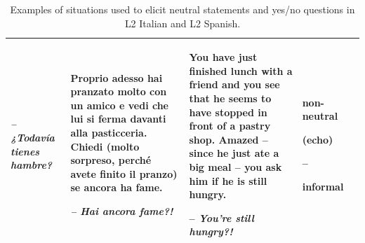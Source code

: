\begin{table}
\begin{tabularx}{\textwidth}{lQQQ>{\raggedright\arraybackslash}p{2cm}}
{\itshape -- ¿Todavía tienes hambre?} & Proprio adesso hai pranzato molto con un amico e vedi che lui si ferma davanti alla pasticceria. Chiedi (molto sorpreso, perché avete finito il pranzo) se ancora ha fame.

\textit{--} \textit{Hai ancora fame?!} & You have just finished lunch with a friend and you see that he seems to have stopped in front of a pastry shop. Amazed -- since he just ate a big meal -- you ask him if he is still hungry.

-- \textit{You’re still hungry?!} & non-neutral

(echo)

--

informal\\
\midrule
\end{tabularx}
\caption{\label{tab:3.1a}Examples of situations used to elicit neutral statements and yes/no questions in L2 Italian and L2 Spanish.}
\end{table}
